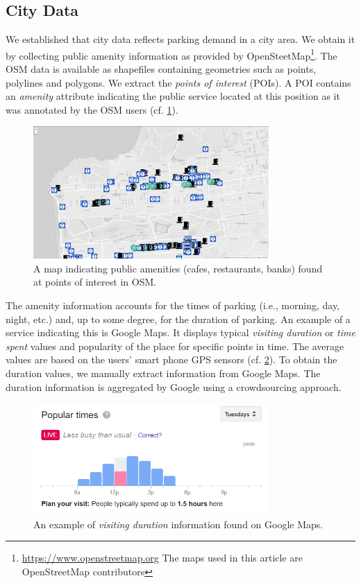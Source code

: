 \subsection{City Data}
\label{sec:citydata}
We established that city data reflects parking demand in a city area. We obtain it by collecting public amenity information as provided by OpenSteetMap\footnote{\url{https://www.openstreetmap.org} The maps used in this article are \textcopyright OpenStreetMap contributors}. The OSM data is available as shapefiles containing geometries such as points, polylines and polygons. We extract the \textit{points of interest} (POIs). A POI contains an \textit{amenity} attribute indicating the public service located at this position as it was annotated by the OSM users (cf. \cref{fig:pois}).

\begin{figure}[!ht]
	\centering
	\includegraphics[width=0.8\textwidth]{graphics/cafes_restaurants_banks_larger.png}
	\caption{A map indicating public amenities (cafes, restaurants, banks) found at points of interest in OSM.}
	\label{fig:pois}
\end{figure}

The amenity information accounts for the times of parking (i.e., morning, day, night, etc.) and, up to some degree, for the duration of parking. An example of a service indicating this is Google Maps.
It displays typical \textit{visiting duration} or \textit{time spent} values and popularity of the place for specific points in time. The average values are based on the users' smart phone GPS sensors (cf. \cref{fig:visit_duration}). To obtain the duration values, we manually extract information from Google Maps. The duration information is aggregated by Google using a crowdsourcing approach. 

\begin{figure}[!ht]
	\centering
	\includegraphics[width=0.8\textwidth]{graphics/google_visit_duration.png}
	\caption{An example of \textit{visiting duration} information found on Google Maps.}
	\label{fig:visit_duration}
\end{figure}

